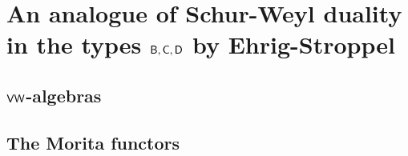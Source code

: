 \section{\texorpdfstring{An analogue of Schur-Weyl duality in the types $\mathsf{B}, \mathsf{C}, \mathsf{D}$ by Ehrig-Stroppel}{}}
    \subsection{\texorpdfstring{$\mathsf{VW}$-algebras}{}}

    \subsection{The Morita functors} 